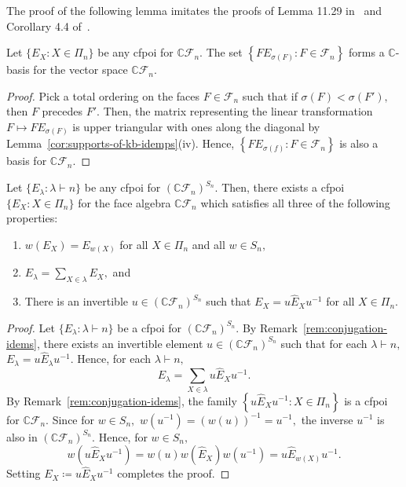 \documentclass[ALCO, Unicode]{cedram}
\def\C{{\mathbb{C}}}
\begin{document}
The proof of the following lemma imitates the proofs of Lemma 11.29 in~\cite{Aguiar-Mahajan} and Corollary 4.4 of~\cite{MSS}.
\begin{lemma}\label{prop:bE_b-form-basis}
    Let $\{E_X: X \in \Pi_n\}$ be any cfpoi for $\C\mathcal{F}_n.$ The set $\left \{FE_{\sigma(F)}: F \in \mathcal{F}_n \right\}$ forms a $\C$-basis for the vector space $\C \mathcal{F}_n.$
\end{lemma}
\begin{proof}
    Pick a total ordering on the faces $F \in \mathcal{F}_n$ such that if $\sigma(F) < \sigma(F'),$ then $F$ precedes $F'.$ Then, the matrix representing the linear transformation $F \mapsto F E_{\sigma(F)}$ is upper triangular with ones along the diagonal by Lemma~\ref{cor:supports-of-kb-idemps}(iv). Hence,  $\left \{F E_{\sigma(f)}: F \in \mathcal{F}_n \right\}$ is also a basis for $\C \mathcal{F}_n.$
\end{proof}

\begin{lemma}\label{lem:invariant-idems-are-sums-of-idems}

Let $\{E_\lambda: \lambda \vdash n\}$ be any cfpoi for $\left(\C \mathcal{F}_n\right)^{S_n}.$ Then, there exists a cfpoi $\{E_X: X \in \Pi_n\}$ for the face algebra $\C \mathcal{F}_n$ which satisfies all three of the following properties:
\begin{enumerate}
    \item[(i)] $w(E_X) = E_{w(X)}$ for all $X \in \Pi_n$ and all $w \in S_n,$
    \item [(ii)] $E_\lambda = \sum_{X \in \lambda}E_X, $ and
    \item[(iii)] There is an invertible $u \in \left(\C \mathcal{F}_n\right)^{S_n}$ such that $E_X = u\widehat{E}_X u^{-1}$ for all $X \in \Pi_n.$
\end{enumerate}
\end{lemma}

\begin{proof}
    Let $\{E_\lambda: \lambda \vdash n\}$ be a cfpoi for $\left(\C \mathcal{F}_n\right)^{S_n}.$ By Remark~\ref{rem:conjugation-idems}, there exists an invertible element $u \in \left(\C \mathcal{F}_n\right)^{S_n}$ such that for each $\lambda \vdash n,$ $E_\lambda = u\widehat{E}_\lambda u^{-1}.$ Hence, for each $\lambda \vdash n,$\[E_\lambda = \sum_{X \in \lambda} u\widehat{E}_X u^{-1}.\]
    By Remark~\ref{rem:conjugation-idems}, the family $\left \{u\widehat{E}_Xu^{-1}: X \in \Pi_n\right\}$ is a cfpoi for $\C \mathcal{F}_n.$ Since for $w \in S_n,$ $w\left(u^{-1}\right) = \left(w(u)
\right)^{-1} = u^{-1},$ the inverse $u^{-1}$ is also in $\left(\C \mathcal{F}_n \right)^{S_n}.$  Hence, for $w \in S_n,$ \[w \left(u \widehat{E}_X u^{-1}\right) = w(u)w \left(\widehat{E}_X\right)w(u^{-1}) = u \widehat{E}_{w(X)}u^{-1}.\] Setting $E_X  \coloneqq  u \widehat{E}_Xu^{-1}$ completes the proof.
\end{proof}
\end{document}
